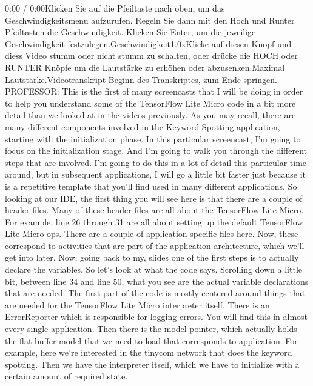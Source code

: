     0:00 / 0:00Klicken Sie auf die Pfeiltaste nach oben, um das Geschwindigkeitsmenu aufzurufen. Regeln Sie dann mit den Hoch und Runter Pfeiltasten die Geschwindigkeit. Klicken Sie Enter, um die jeweilige Geschwindigkeit festzulegen.Geschwindigkeit1.0xKlicke auf diesen Knopf und diess Video stumm oder nicht stumm zu schalten, oder drücke die HOCH oder RUNTER Knöpfe um die Lautstärke zu erhöhen oder abzusenken.Maximal Lautstärke.Videotranskript
    Beginn des Transkriptes, zum Ende springen.
    PROFESSOR: This is the first of many screencasts
    that I will be doing in order to help you understand some of the TensorFlow
    Lite Micro code in a bit more detail than we looked at in the videos
    previously.
    As you may recall, there are many different components
    involved in the Keyword Spotting application,
    starting with the initialization phase.
    In this particular screencast, I'm going to focus on the initialization stage.
    And I'm going to walk you through the different steps that are involved.
    I'm going to do this in a lot of detail this particular time around,
    but in subsequent applications, I will go a little bit
    faster just because it is a repetitive template that you'll find
    used in many different applications.
    So looking at our IDE, the first thing you will see here
    is that there are a couple of header files.
    Many of these header files are all about the TensorFlow Lite Micro.
    For example, line 26 through 31 are all about setting up the default TensorFlow
    Lite Micro ops.
    There are a couple of application-specific files here.
    Now, these correspond to activities that are
    part of the application architecture, which we'll get into later.
    Now, going back to my, slides one of the first steps
    is to actually declare the variables.
    So let's look at what the code says.
    Scrolling down a little bit, between line 34 and line 50, what you see
    are the actual variable declarations that are needed.
    The first part of the code is mostly centered around things
    that are needed for the TensorFlow Lite Micro interpreter itself.
    There is an ErrorReporter which is responsible for logging errors.
    You will find this in almost every single application.
    Then there is the model pointer, which actually holds the flat buffer
    model that we need to load that corresponds to application.
    For example, here we're interested in the tinycom
    network that does the keyword spotting.
    Then we have the interpreter itself, which
    we have to initialize with a certain amount of required state.
